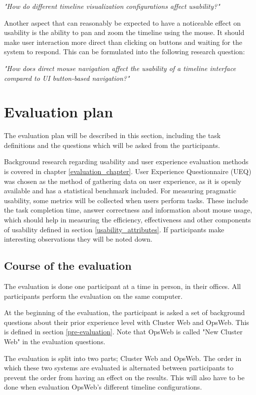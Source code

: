 \textit{"How do different timeline visualization configurations affect usability?"}

Another aspect that can reasonably be expected to have a noticeable effect on usability is the ability to pan and zoom the timeline using the mouse. It should make user interaction more direct than clicking on buttons and waiting for the system to respond. This can be formulated into the following research question:

\textit{"How does direct mouse navigation affect the usability of a timeline interface compared to UI button-based navigation?"}

\section{Evaluation plan} \label{evaluation_plan}
The evaluation plan will be described in this section, including the task definitions and the questions which will be asked from the participants.

Background research regarding usability and user experience evaluation methods is covered in chapter \ref{evaluation_chapter}. User Experience Questionnaire (UEQ) \cite{laugwitz2008construction} was chosen as the method of gathering data on user experience, as it is openly available and has a statistical benchmark included. For measuring pragmatic usability, some metrics will be collected when users perform tasks. These include the task completion time, answer correctness and information about mouse usage, which should help in measuring the efficiency, effectiveness and other components of usability defined in section \ref{usability_attributes}. If participants make interesting observations they will be noted down.

\subsection{Course of the evaluation}
The evaluation is done one participant at a time in person, in their offices. All participants perform the evaluation on the same computer.

At the beginning of the evaluation, the participant is asked a set of background questions about their prior experience level with Cluster Web and OpsWeb. This is defined in section \ref{pre-evaluation}. Note that OpsWeb is called "New Cluster Web" in the evaluation questions.

The evaluation is split into two parts; Cluster Web and OpsWeb. The order in which these two systems are evaluated is alternated between participants to prevent the order from having an effect on the results. This will also have to be done when evaluation OpsWeb's different timeline configurations.

